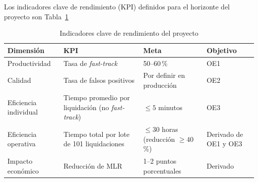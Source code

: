 Los indicadores clave de rendimiento (KPI) definidos para el horizonte del proyecto son Tabla~\ref{tab:kpi-proyecto}

\begin{table}[H]
    \centering
    \caption{Indicadores clave de rendimiento del proyecto}
    \label{tab:kpi-proyecto}

    \begin{tabular}{
        p{}
        p{}
        p{}
        p{}
    }
        \toprule
        \textbf{Dimensión}
        & \textbf{KPI}
        & \textbf{Meta}
        & \textbf{Objetivo} \\
        \midrule

        Productividad
        & Tasa de \textit{fast-track}
        & 50--60\,\%
        & OE1 \\

        Calidad
        & Tasa de falsos positivos
        & Por definir en producción
        & OE2 \\

        Eficiencia individual
        & Tiempo promedio por liquidación (no \textit{fast-track})
        & $\leq 5$ minutos
        & OE3 \\

        Eficiencia operativa
        & Tiempo total por lote de 101 liquidaciones
        & $\leq 30$ horas (reducción $\geq 40$\,\%)
        & Derivado de OE1 y OE3 \\

        Impacto económico
        & Reducción de MLR
        & 1--2 puntos porcentuales
        & Derivado \\

        \bottomrule
    \end{tabular}
\end{table}



\newpage
